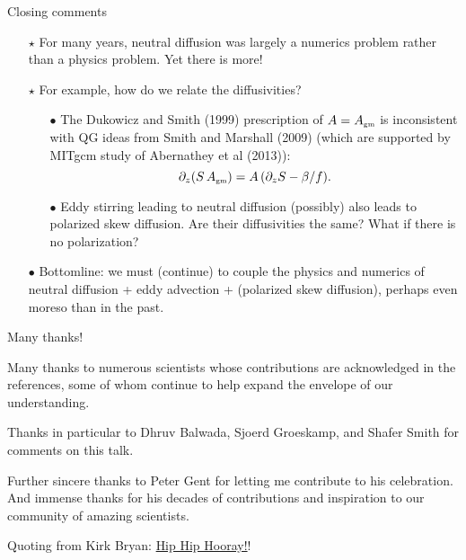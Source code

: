 \documentclass{beamer}
\begin{document}
\begin{frame}{Closing comments}

\begin{itemize}

\item[$\star$] For many years, neutral diffusion was largely a numerics problem rather than a physics problem. Yet there is more! 

\item[$\star$] For example, how do we relate the diffusivities? \begin{itemize}

        \item[$\bullet$] The Dukowicz and Smith (1999) prescription of $A = A_{\mbox{\tiny gm}}$ is inconsistent with QG ideas from Smith and Marshall (2009) (which are supported by MITgcm study of Abernathey et al (2013)):
    \begin{equation}
           \partial_{z}(S \, A_{\mbox{\tiny gm}})  =
           A \, (\partial_{z}S -\beta/f).
    \end{equation}       
    
    \item[$\bullet$] Eddy stirring leading to neutral diffusion (possibly) also leads to polarized skew diffusion. Are their diffusivities the same? What if there is no polarization?    
         
       \end{itemize}
 
      \item[$\bullet$] Bottomline: we must (continue) to couple the physics and numerics of neutral diffusion + eddy advection + (polarized skew diffusion), perhaps even moreso than in the past. 

\end{itemize}

\end{frame}




\begin{frame}{Many thanks!}


Many thanks to numerous scientists whose contributions are acknowledged in the references, some of whom continue to help expand the envelope of our understanding.  

\vspace{.25cm} Thanks in particular to Dhruv Balwada, Sjoerd Groeskamp, and Shafer Smith for comments on this talk.  


\vspace{1cm}

Further sincere thanks to Peter Gent for letting me contribute to his celebration. And immense thanks for his decades of contributions and inspiration to our community of amazing scientists. 

\centering 

\vspace{0.5cm}
Quoting from Kirk Bryan: \underline{Hip Hip Hooray!}!  




\end{frame}
\end{document}
